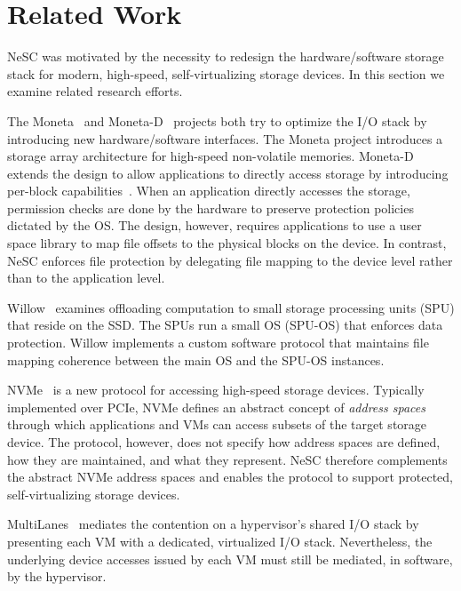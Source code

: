 \section{Related Work}
\label{sec:related}

NeSC was motivated by the necessity to redesign the hardware/software storage stack for modern, high-speed, self-virtualizing storage devices. In this section we examine related research efforts.

The Moneta~\cite{caulfield10moneta} and Moneta-D~\cite{caulfield12moneta-d} projects both try to optimize the I/O stack by introducing new hardware/software interfaces.
The Moneta project introduces a storage array architecture for high-speed non-volatile memories. Moneta-D extends the design to allow applications
to directly access storage by introducing per-block capabilities~\cite{levy1984capability}. When an application directly accesses the storage, permission checks are done by the hardware to preserve protection policies dictated by the OS.
The design, however, requires applications to use a user space library to map file offsets to the physical blocks on the device.
In contrast, NeSC enforces file protection by delegating file mapping to the device level rather than to the application level.

Willow~\cite{seshadri2014willow} examines offloading computation to small storage processing units (SPU) that reside on the SSD. The SPUs run a small OS (SPU-OS) that enforces data protection. Willow implements a custom software protocol that maintains file mapping coherence between the main OS and the SPU-OS instances.

NVMe~\cite{nvme} is a new protocol for accessing high-speed storage devices. Typically implemented over PCIe, NVMe defines an abstract concept of \emph{address spaces} through which applications and VMs can access subsets of the target storage device. The protocol, however, does not specify how address spaces are defined, how they are maintained, and what they represent. 
NeSC therefore complements the abstract NVMe address spaces and enables the protocol to support protected, self-virtualizing storage devices.


MultiLanes~\cite{kang2014multilanes}
mediates the contention on a hypervisor's shared I/O stack by presenting each VM with a dedicated, virtualized I/O stack. Nevertheless, the underlying device accesses issued by each VM must still be mediated, in software, by the hypervisor.


